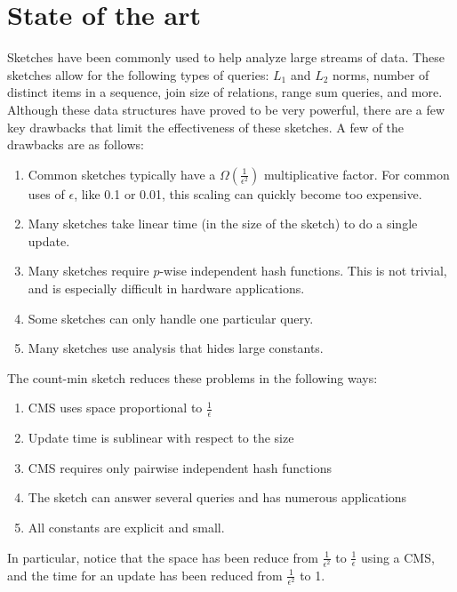 \documentclass[11pt]{article}
\begin{document}
\section{State of the art}
Sketches have been commonly used to help analyze large streams of data. These sketches allow for the following types of queries: $L_1$ and $L_2$ norms, number of distinct items in a sequence, join size of relations, range sum queries, and more. Although these data structures have proved to be very powerful, there are a few key drawbacks that limit the effectiveness of these sketches. A few of the drawbacks are as follows:
\begin{enumerate}
    \item Common sketches typically have a $\Omega(\frac{1}{\epsilon^2})$ multiplicative factor. For common uses of $\epsilon$, like 0.1 or 0.01, this scaling can quickly become too expensive.
    \item Many sketches take linear time (in the size of the sketch) to do a single update. 
    \item Many sketches require $p$-wise independent hash functions. This is not trivial, and is especially difficult in hardware applications.
    \item Some sketches can only handle one particular query.
    \item Many sketches use analysis that hides large constants.
\end{enumerate}
The count-min sketch reduces these problems in the following ways:
\begin{enumerate}
    \item CMS uses space proportional to $\frac{1}{\epsilon}$
    \item Update time is sublinear with respect to the size
    \item CMS requires only pairwise independent hash functions
    \item The sketch can answer several queries and has numerous applications
    \item All constants are explicit and small.
\end{enumerate}
In particular, notice that the space has been reduce from $\frac{1}{\epsilon^2}$ to $\frac{1}{\epsilon}$ using a CMS, and the time for an update has been reduced from $\frac{1}{\epsilon^2}$ to 1.
\end{document}
